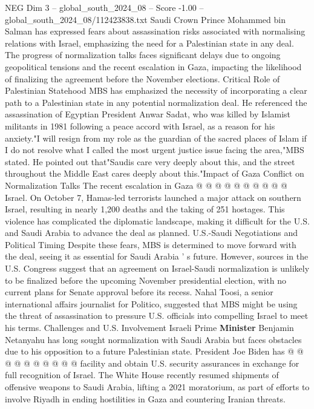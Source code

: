 \begin{textsample}{NEG Dim 3 – global\_south\_2024\_08 – Score -1.00 – global\_south\_2024\_08/112423838.txt}  \label{ex:f3_neg_156}
Saudi Crown Prince Mohammed bin Salman has expressed fears about assassination risks associated with normalising relations with Israel, emphasizing the need for a Palestinian state in any deal.
The progress of normalization talks faces significant delays due to ongoing geopolitical tensions and the recent escalation in Gaza, impacting the likelihood of finalizing the agreement before the November elections.
Critical Role of Palestinian Statehood MBS has emphasized the necessity of incorporating a clear path to a Palestinian state in any potential normalization deal.
He referenced the assassination of Egyptian President Anwar Sadat, who was killed by Islamist militants in 1981 following a peace accord with Israel, as a reason for his anxiety."I will resign from my role as the guardian of the sacred places of Islam if I do not resolve what I called the most urgent justice issue facing the area,"MBS stated.
He pointed out that"Saudis care very deeply about this, and the street throughout the Middle East cares deeply about this."Impact of Gaza Conflict on Normalization Talks The recent escalation in Gaza @ @ @ @ @ @ @ @ @ @ Israel.
On October 7, Hamas-led terrorists launched a major attack on southern Israel, resulting in nearly 1,200 deaths and the taking of 251 hostages.
This violence has complicated the diplomatic landscape, making it difficult for the U.S. and Saudi Arabia to advance the deal as planned.
U.S.-Saudi Negotiations and Political Timing Despite these fears, MBS is determined to move forward with the deal, seeing it as essential for Saudi Arabia ' s future.
However, sources in the U.S.
Congress suggest that an agreement on Israel-Saudi normalization is unlikely to be finalized before the upcoming November presidential election, with no current plans for Senate approval before its recess.
Nahal Toosi, a senior international affairs journalist for Politico, suggested that MBS might be using the threat of assassination to pressure U.S. officials into compelling Israel to meet his terms.
Challenges and U.S.
Involvement Israeli Prime \textbf{Minister} Benjamin Netanyahu has long sought normalization with Saudi Arabia but faces obstacles due to his opposition to a future Palestinian state.
President Joe Biden has @ @ @ @ @ @ @ @ @ @ facility and obtain U.S. security assurances in exchange for full recognition of Israel.
The White House recently resumed shipments of offensive weapons to Saudi Arabia, lifting a 2021 moratorium, as part of efforts to involve Riyadh in ending hostilities in Gaza and countering Iranian threats.

\end{textsample}
